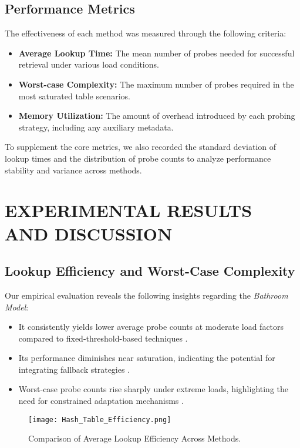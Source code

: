 \documentclass[letterpaper]{article}
\begin{document}
\subsection{Performance Metrics}

The effectiveness of each method was measured through the following criteria:
\begin{itemize}
    \item \textbf{Average Lookup Time:} The mean number of probes needed for successful retrieval under various load conditions.
    \item \textbf{Worst-case Complexity:} The maximum number of probes required in the most saturated table scenarios.
    \item \textbf{Memory Utilization:} The amount of overhead introduced by each probing strategy, including any auxiliary metadata.
\end{itemize}

To supplement the core metrics, we also recorded the standard deviation of lookup times and the distribution of probe counts to analyze performance stability and variance across methods.

\section{EXPERIMENTAL RESULTS AND DISCUSSION}

\subsection{Lookup Efficiency and Worst-Case Complexity}

Our empirical evaluation reveals the following insights regarding the \textit{Bathroom Model}:
\begin{itemize}
    \item It consistently yields lower average probe counts at moderate load factors compared to fixed-threshold-based techniques \cite{cormen2009}.
    \item Its performance diminishes near saturation, indicating the potential for integrating fallback strategies \cite{knuth1998}.
    \item Worst-case probe counts rise sharply under extreme loads, highlighting the need for constrained adaptation mechanisms \cite{mitzenmacher2005}.
\end{itemize}

\begin{figure}[H]
    \centering
    \texttt{[image: Hash\_Table\_Efficiency.png]}
    \caption{Comparison of Average Lookup Efficiency Across Methods.}
    \label{fig:lookup_efficiency}
\end{figure}
\end{document}
